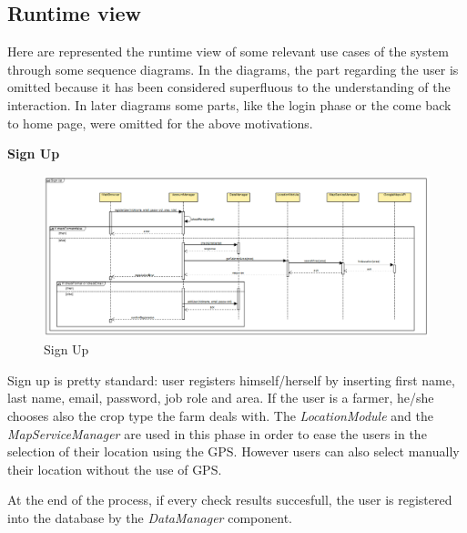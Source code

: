 \documentclass[table, 12pt]{article}
\begin{document}
\subsection{Runtime view}

Here are represented the runtime view of some relevant use cases of the system through some sequence diagrams. 
In the diagrams, the part regarding the user is omitted because it has been considered superfluous to the understanding of the interaction.
In later diagrams some parts, like the login phase or the come back to home page, were omitted for the above motivations.

\newpage
\textbf{Sign Up}
\begin{center}
    \begin{figure}[H]
        \includegraphics[scale=0.4, center]{assets/SequenceDiagram/SignUp.png}
        \caption{Sign Up}
        \label{fig:signup}
    \end{figure}
\end{center}
Sign up is pretty standard: user registers himself/herself by inserting first name, last name, email, password, job role and area. If the user is a farmer, he/she chooses also the crop type the farm deals with.
The \textit{LocationModule} and the \textit{MapServiceManager} are used in this phase in order to ease the users in the selection of their location using the GPS. 
However users can also select manually their location without the use of GPS.

At the end of the process, if every check results succesfull, the user is registered into the database by the \textit{DataManager} component.
\end{document}
